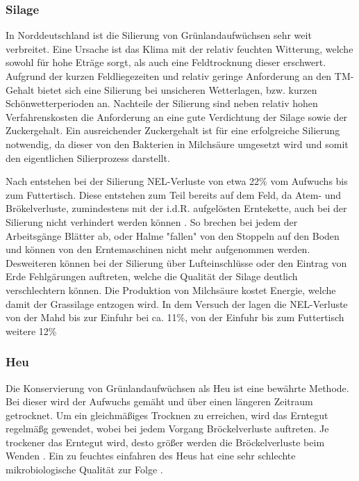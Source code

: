 \subsubsection{Silage}
\label{subsub:Silage}
In Norddeutschland ist die Silierung von Grünlandaufwüchsen sehr weit verbreitet.
Eine Ursache ist das Klima mit der relativ feuchten Witterung, welche sowohl für hohe Eträge sorgt, als auch eine Feldtrocknung dieser erschwert.
Aufgrund der kurzen Feldliegezeiten und relativ geringe Anforderung an den \ac{TM}-Gehalt bietet sich eine Silierung bei unsicheren Wetterlagen, bzw. kurzen Schönwetterperioden an.
Nachteile der Silierung sind neben relativ hohen Verfahrenskosten die Anforderung an eine gute Verdichtung der Silage sowie der Zuckergehalt.
Ein ausreichender Zuckergehalt ist für eine erfolgreiche Silierung notwendig, da dieser von den Bakterien in Milchsäure umgesetzt wird und somit den eigentlichen Silierprozess darstellt.

Nach \textcite[30]{fritz2018wirtschaftliche} entstehen bei der Silierung \ac{NEL}-Verluste von etwa 22\% vom Aufwuchs bis zum Futtertisch.
Diese entstehen zum Teil bereits auf dem Feld, da Atem- und Brökelverluste, zumindestens mit der i.d.R. aufgelösten Erntekette, auch bei der Silierung nicht verhindert werden können \parencite[58f]{gruber2015einfluss}.
So brechen bei jedem der Arbeitsgänge Blätter ab, oder Halme "fallen" von den Stoppeln auf den Boden und können von den Erntemaschinen nicht mehr aufgenommen werden.
Desweiteren können bei der Silierung über Lufteinschlüsse oder den Eintrag von Erde Fehlgärungen auftreten, welche die Qualität der Silage deutlich verschlechtern können.
Die Produktion von Milchsäure kostet Energie, welche damit der Grassilage entzogen wird\parencite[61]{gruber2015einfluss}.
In dem Versuch der \HBLFA lagen die \ac{NEL}-Verluste von der Mahd bis zur Einfuhr bei ca. 11\%, von der Einfuhr bis zum Futtertisch weitere 12\% \parencite[30]{fritz2018wirtschaftliche}


\subsubsection{Heu}
\label{subsub:Heu}
Die Konservierung von Grünlandaufwüchsen als Heu ist eine bewährte Methode.
Bei dieser wird der Aufwuchs gemäht und über einen längeren Zeitraum getrocknet.
Um ein gleichmäßiges Trocknen zu erreichen, wird das Erntegut regelmäßg gewendet, wobei bei jedem Vorgang Bröckelverluste auftreten.
Je trockener das Erntegut wird, desto größer werden die Bröckelverluste beim Wenden \parencite[12]{sauter2008brockelverluste}.
Ein zu feuchtes einfahren des Heus hat eine sehr schlechte mikrobiologische Qualität zur Folge \parencite[269]{besier2013heu}.

